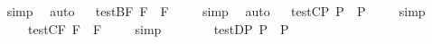 \begin{isabellebody}
\isadelimproof
\ %
\endisadelimproof
%
\isatagproof
{}\isamarkupfalse%
\ simp\ \isamarkupfalse%
\ auto%
\endisatagproof
{\isafoldproof}%
%
\isadelimproof
%
\endisadelimproof
\isanewline
\ \isamarkupfalse%
\ test{\isacharunderscore}B{\isacharunderscore}F{\isacharcolon}\ {\isachardoublequoteopen}{\isacharbrackleft}\isactrlbold {\isasymdiamond}\isactrlbold {\isasymbox}{\isasymphi}\isactrlsup F\ \isactrlbold {\isasymrightarrow}\ \isactrlbold {\isasymdiamond}{\isasymphi}\isactrlsup F{\isacharbrackright}\ {\isacharequal}\ {\isasymtop}{\isachardoublequoteclose}%
\isadelimproof
\ %
\endisadelimproof
%
\isatagproof
{}\isamarkupfalse%
\ simp\ \isamarkupfalse%
\ auto%
\endisatagproof
{\isafoldproof}%
%
\isadelimproof
%
\endisadelimproof
\isanewline
\isanewline
\ \isamarkupfalse%
\ test{\isacharunderscore}C{\isacharunderscore}P{\isacharcolon}\ {\isachardoublequoteopen}{\isacharbrackleft}\isactrlbold {\isasymbox}\isactrlbold {\isasymdiamond}{\isasymphi}\isactrlsup P\ \isactrlbold {\isasymrightarrow}\ \isactrlbold {\isasymbox}{\isasymphi}\isactrlsup P{\isacharbrackright}\ {\isacharequal}\ {\isasymtop}{\isachardoublequoteclose}%
\isadelimproof
\ %
\endisadelimproof
%
\isatagproof
{}\isamarkupfalse%
\ simp%
\endisatagproof
{\isafoldproof}%
%
\isadelimproof
%
\endisadelimproof
\ \isamarkupfalse%
%
\isadelimproof
\ %
\endisadelimproof
%
\isatagproof
{}\isamarkupfalse%
\ %
%
\endisatagproof
{\isafoldproof}%
%
\isadelimproof
%
\endisadelimproof
\isanewline
\ \isamarkupfalse%
\ test{\isacharunderscore}C{\isacharunderscore}F{\isacharcolon}\ {\isachardoublequoteopen}{\isacharbrackleft}\isactrlbold {\isasymbox}\isactrlbold {\isasymdiamond}{\isasymphi}\isactrlsup F\ \isactrlbold {\isasymrightarrow}\ \isactrlbold {\isasymbox}{\isasymphi}\isactrlsup F{\isacharbrackright}\ {\isacharequal}\ {\isasymtop}{\isachardoublequoteclose}%
\isadelimproof
\ %
\endisadelimproof
%
\isatagproof
{}\isamarkupfalse%
\ simp%
\endisatagproof
{\isafoldproof}%
%
\isadelimproof
%
\endisadelimproof
\ \isamarkupfalse%
%
\isadelimproof
\ %
\endisadelimproof
%
\isatagproof
{}\isamarkupfalse%
\ %
%
\endisatagproof
{\isafoldproof}%
%
\isadelimproof
%
\endisadelimproof
\isanewline
\isanewline
\ \isamarkupfalse%
\ test{\isacharunderscore}D{\isacharunderscore}P{\isacharcolon}\ {\isachardoublequoteopen}{\isacharbrackleft}\isactrlbold {\isasymdiamond}\isactrlbold {\isasymbox}{\isasymphi}\isactrlsup P\ \isactrlbold {\isasymrightarrow}\ \isactrlbold {\isasymbox}{\isasymphi}\isactrlsup P{\isacharbrackright}\ {\isacharequal}\ {\isasymtop}{\isachardoublequoteclose}%

\end{isabellebody}
